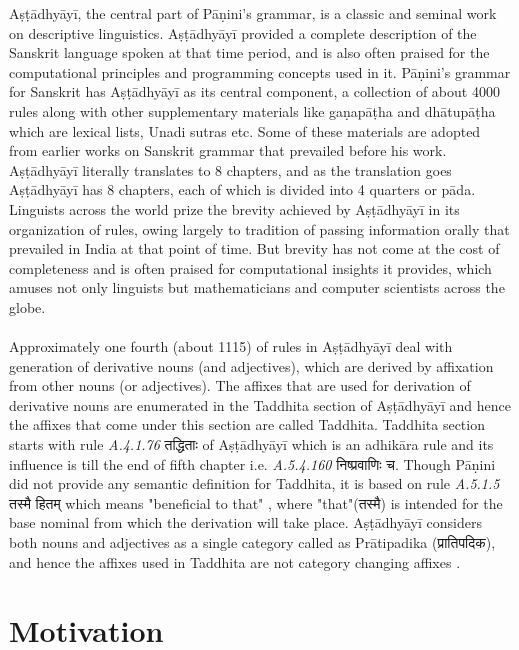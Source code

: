 \documentclass[a4paper,11pt,twoside,openright]{report}
\begin{document}
Aṣṭādhyāyī, the central part of Pāṇini's grammar, is a classic and seminal work on descriptive linguistics. Aṣṭādhyāyī provided a complete description of the Sanskrit language spoken at that time period, and is also often praised for the computational principles and programming concepts used in it. Pāṇini’s grammar for Sanskrit has Aṣṭādhyāyī as its central component, a collection of about 4000 rules along with other supplementary materials like gaṇapāṭha and dhātupāṭha which are lexical lists, Unadi sutras etc. Some of these materials are adopted from earlier works on Sanskrit grammar that
prevailed before his work. Aṣṭādhyāyī literally translates to 8 chapters, and as the translation
goes Aṣṭādhyāyī has 8 chapters, each of which is divided into 4 quarters or pāda. Linguists across the world prize the brevity achieved by Aṣṭādhyāyī in its organization of rules, owing largely to tradition of passing information orally that prevailed in India at that point of time. But brevity has not come at the cost of completeness and is often praised for computational insights it provides, which amuses not only linguists but mathematicians and computer scientists across the globe.
\\ \\
Approximately one fourth (about 1115) of rules in Aṣṭādhyāyī deal with generation of derivative nouns (and adjectives), which are derived by affixation from other nouns (or adjectives). The affixes that are used for derivation of derivative nouns are enumerated in the Taddhita section of Aṣṭādhyāyī and hence the affixes that come under this section are called Taddhita. Taddhita section starts with rule \textsl{ A.4.1.76} { \skt तद्धिताः} of Aṣṭādhyāyī  which is an adhikāra rule and its influence is till the end of fifth chapter i.e. \textsl{ A.5.4.160} {\skt निष्प्रवाणिः च}. Though Pāṇini did not provide any semantic definition for Taddhita, it is based on rule \textsl{ A.5.1.5} {\skt तस्मै हितम्} which means "beneficial to that" \cite{bhate89}, where "that"({\skt तस्मै}) is intended for the base nominal from which the derivation will take place. Aṣṭādhyāyī considers both nouns and adjectives as a single category called as Prātipadika ({\skt प्रातिपदिक}), and hence the affixes used in Taddhita are not category changing affixes \cite{deo07}.

\section{Motivation}
\end{document}
